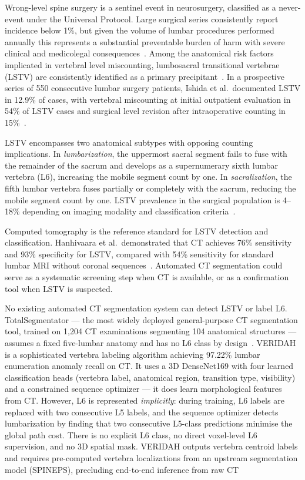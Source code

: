 \documentclass{article}
\begin{document}
Wrong-level spine surgery is a sentinel event in neurosurgery, classified as a
never-event under the Universal Protocol. Large surgical series consistently
report incidence below 1\%, but given the volume of lumbar procedures performed
annually this represents a substantial preventable burden of harm with severe
clinical and medicolegal consequences~\citep{albano2024}. Among the anatomical
risk factors implicated in vertebral level miscounting, lumbosacral transitional
vertebrae (LSTV) are consistently identified as a primary
precipitant~\citep{albano2024,karsy2024}. In a prospective series of 550
consecutive lumbar surgery patients, Ishida et al.\ documented LSTV in 12.9\%
of cases, with vertebral miscounting at initial outpatient evaluation in 54\% of
LSTV cases and surgical level revision after intraoperative counting in
15\%~\citep{ishida2017}.

LSTV encompasses two anatomical subtypes with opposing counting implications.
In \textit{lumbarization}, the uppermost sacral segment fails to fuse with the
remainder of the sacrum and develops as a supernumerary sixth lumbar vertebra
(L6), increasing the mobile segment count by one. In \textit{sacralization},
the fifth lumbar vertebra fuses partially or completely with the sacrum, reducing
the mobile segment count by one. LSTV prevalence in the surgical population is
4--18\% depending on imaging modality and classification
criteria~\citep{apazidis2011,nardo2012}.

Computed tomography is the reference standard for LSTV detection and
classification. Hanhivaara et al.\ demonstrated that CT achieves 76\%
sensitivity and 93\% specificity for LSTV, compared with 54\% sensitivity for
standard lumbar MRI without coronal sequences~\citep{hanhivaara2024}. Automated
CT segmentation could serve as a systematic screening step when CT is available,
or as a confirmation tool when LSTV is suspected.

No existing automated CT segmentation system can detect LSTV or label L6.
TotalSegmentator --- the most widely deployed general-purpose CT segmentation
tool, trained on 1,204 CT examinations segmenting 104 anatomical structures ---
assumes a fixed five-lumbar anatomy and has no L6 class by
design~\citep{wasserthal2023}. VERIDAH~\citep{moller2026} is a sophisticated vertebra labeling
algorithm achieving 97.22\% lumbar enumeration anomaly recall on CT. It uses a
3D DenseNet169 with four learned classification heads (vertebra label, anatomical
region, transition type, visibility) and a constrained sequence optimizer ---
it does learn morphological features from CT. However, L6 is represented
\textit{implicitly}: during training, L6 labels are replaced with two consecutive
L5 labels, and the sequence optimizer detects lumbarization by finding that two
consecutive L5-class predictions minimise the global path cost. There is no
explicit L6 class, no direct voxel-level L6 supervision, and no 3D spatial mask.
VERIDAH outputs vertebra centroid labels and requires pre-computed vertebra
localizations from an upstream segmentation model (SPINEPS), precluding
end-to-end inference from raw CT
\end{document}
